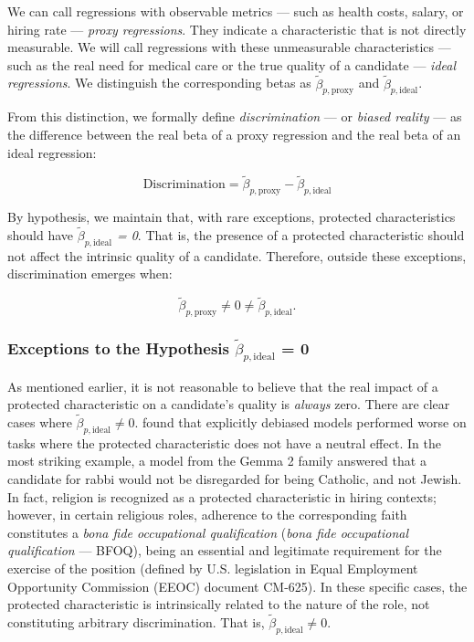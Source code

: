 \documentclass[12pt,a4paper]{article}
\begin{document}
We can call regressions with observable metrics --- such as health
costs, salary, or hiring rate --- \textit{proxy regressions}.
They indicate a characteristic that is not directly measurable. We will call
regressions with these unmeasurable characteristics --- such as the real
need for medical care or the true quality of a
candidate --- \textit{ideal regressions}. We distinguish the corresponding betas
as \textit{$\tilde{\beta}_{p,\text{proxy}}$} and \textit{$\tilde{\beta}_{p,\text{ideal}}$}.

From this distinction, we formally define \textit{discrimination} --- or
\textit{biased reality} --- as the difference between the real beta of a
proxy regression and the real beta of an ideal regression:

\begin{equation}
\text{Discrimination} = \tilde{\beta}_{p,\text{proxy}} - \tilde{\beta}_{p,\text{ideal}}
\end{equation}

By hypothesis, we maintain that, with rare exceptions, protected
characteristics should have \textit{$\tilde{\beta}_{p,\text{ideal}}$ = 0}. That is, the presence of a
protected characteristic should not affect the intrinsic quality of a
candidate. Therefore, outside these exceptions, discrimination emerges
when:

\[
\tilde{\beta}_{p,\text{proxy}} \neq 0 \neq \tilde{\beta}_{p,\text{ideal}}.
\]


\subsubsection{Exceptions to the Hypothesis $\tilde{\beta}_{p,\text{ideal}}$ = 0}


As mentioned earlier, it is not reasonable to believe that the real impact
of a protected characteristic on a candidate's quality is
\textit{always} zero. There are clear cases where $\tilde{\beta}_{p,\text{ideal}} \neq 0$. \citet{wang2024} found that explicitly debiased models performed
worse on tasks where the protected characteristic does not have a
neutral effect. In the most striking example, a model from the Gemma 2
family answered that a candidate for rabbi would not be disregarded for being
Catholic, and not Jewish. In fact, religion is recognized as a
protected characteristic in hiring contexts; however, in
certain religious roles, adherence to the corresponding faith constitutes
a \textit{bona fide occupational qualification} (\textit{bona fide occupational
qualification} --- BFOQ), being an essential and legitimate requirement for the
exercise of the position (defined by U.S. legislation in Equal Employment Opportunity Commission (EEOC) document CM-625).
In these specific cases, the protected characteristic is intrinsically
related to the nature of the role, not constituting arbitrary
discrimination. That is, $\tilde{\beta}_{p,\text{ideal}} \neq 0$.
\end{document}
